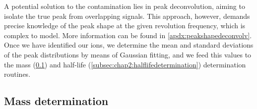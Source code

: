 A potential solution to the contamination lies in peak deconvolution, aiming to isolate the true peak from overlapping signals. This approach, however, demands precise knowledge of the peak shape at the given revolution frequency, which is complex to model. More information can be found in \cref{apdx:peakshapedeconvolv}.
\newpar
Once we have identified our ions, we determine the mean and standard deviations of the peak distributions by means of Gaussian fitting, and we feed this values to the mass (\cref{subsec:chap2:massdetermination}) and half-life (\cref{subsec:chap2:halflifedetermination}) determination routines.

\subsection{Mass determination}\label{subsec:chap2:massdetermination}

